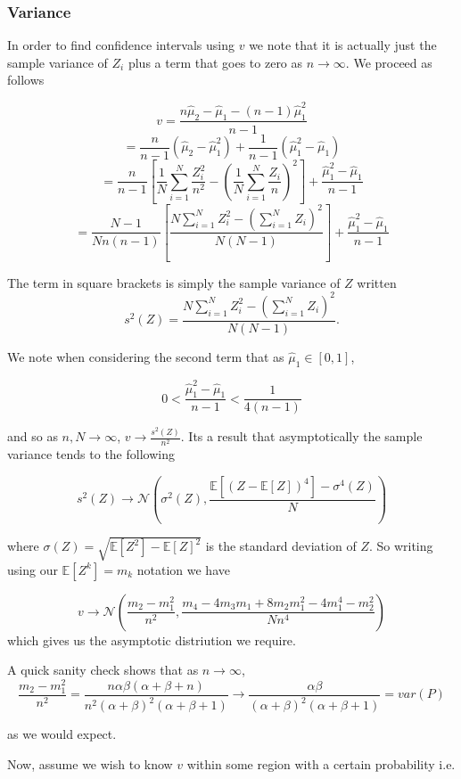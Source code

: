 \documentclass[
10pt, %
a4paper, %
oneside, %
headinclude,footinclude, %
BCOR5mm, %
]{scrartcl}
\begin{document}
\subsubsection{Variance}
In order to find confidence intervals using $v$ we note that it is actually just the sample variance of $Z_i$ plus a term that goes to zero as $n \rightarrow \infty$. We proceed as follows

$$ v = \frac{n \hat{\mu}_2 - \hat{\mu}_1 - (n-1)\hat{\mu}_1^2}{n-1}$$
$$ = \frac{n}{n-1} (\hat{\mu}_2 - \hat{\mu}_1^2) + \frac{1}{n-1} (\hat{\mu}_1^2 - \hat{\mu}_1)$$
$$ = \frac{n}{n-1} \left [ \frac{1}{N} \sum_{i=1}^N \frac{Z_i^2}{n^2} - \left( \frac{1}{N} \sum_{i=1}^N \frac{Z_i}{n} \right )^2 \right ] + \frac{\hat{\mu}_1^2 - \hat{\mu}_1}{n-1}$$
$$ = \frac{N-1}{Nn(n-1)} \left [ \frac{N \sum_{i=1}^N Z_i^2 - \left( \sum_{i=1}^N Z_i \right )^2}{N(N-1)} \right ] + \frac{\hat{\mu}_1^2 - \hat{\mu}_1}{n-1}$$

The term in square brackets is simply the sample variance of $Z$ written
$$ s^2(Z) = \frac{N \sum_{i=1}^N Z_i^2 - \left( \sum_{i=1}^N Z_i \right )^2}{N(N-1)}. $$

We note when considering the second term that as $\hat{\mu}_1 \in [0,1]$,

$$ 0 < \frac{\hat{\mu}_1^2 - \hat{\mu}_1}{n-1} < \frac{1}{4(n-1)} $$

and so as $n, N \rightarrow \infty$, $v \rightarrow \frac{s^2(Z)}{n^2} $. Its a result \cite{bworld} that asymptotically the sample variance tends to the following

$$ s^2(Z) \rightarrow \mathcal{N} \left (\sigma^2(Z), \frac{\mathbb{E}[(Z - \mathbb{E}[Z])^4] - \sigma^4(Z)}{N} \right )$$

where $\sigma(Z) = \sqrt{\mathbb{E}[Z^2] - \mathbb{E}[Z]^2}$ is the standard deviation of $Z$. So writing using our $\mathbb{E}[Z^k] = m_k$ notation we have

$$ v \rightarrow \mathcal{N} \left ( \frac{m_2 - m_1^2}{n^2}, \frac{m_4 - 4m_3m_1 + 8m_2m_1^2 - 4m_1^4 - m_2^2}{Nn^4} \right )$$
which gives us the asymptotic distriution we require.

A quick sanity check shows that as $n \rightarrow \infty$,
$$ \frac{m_2 - m_1^2}{n^2} = \frac{n \alpha \beta (\alpha + \beta + n)}{n^2 (\alpha + \beta)^2(\alpha + \beta + 1)} \rightarrow \frac{\alpha \beta}{ (\alpha + \beta)^2(\alpha + \beta + 1)} = var(P)$$

as we would expect.

Now, assume we wish to know $v$ within some region with a certain probability i.e.
\end{document}
